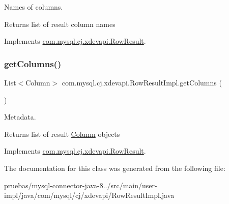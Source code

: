Names of columns.

\begin{DoxyReturn}{Returns}
list of result column names 
\end{DoxyReturn}


Implements \mbox{\hyperlink{interfacecom_1_1mysql_1_1cj_1_1xdevapi_1_1_row_result_acbc412c859e4618f3b924c602a82f541}{com.\+mysql.\+cj.\+xdevapi.\+Row\+Result}}.

\mbox{\label{classcom_1_1mysql_1_1cj_1_1xdevapi_1_1_row_result_impl_a080528edc647e5ab131333d69042b167}} 
\subsubsection{\texorpdfstring{get\+Columns()}{getColumns()}}
{\footnotesize\ttfamily List$<$Column$>$ com.\+mysql.\+cj.\+xdevapi.\+Row\+Result\+Impl.\+get\+Columns (\begin{DoxyParamCaption}{ }\end{DoxyParamCaption})}

Metadata.

\begin{DoxyReturn}{Returns}
list of result \mbox{\hyperlink{interfacecom_1_1mysql_1_1cj_1_1xdevapi_1_1_column}{Column}} objects 
\end{DoxyReturn}


Implements \mbox{\hyperlink{interfacecom_1_1mysql_1_1cj_1_1xdevapi_1_1_row_result_a4bd495dadd5549516c0f32366f8d77c7}{com.\+mysql.\+cj.\+xdevapi.\+Row\+Result}}.



The documentation for this class was generated from the following file\+:\begin{DoxyCompactItemize}
\item 
pruebas/mysql-\/connector-\/java-\/8../src/main/user-\/impl/java/com/mysql/cj/xdevapi/Row\+Result\+Impl.\+java\end{DoxyCompactItemize}
